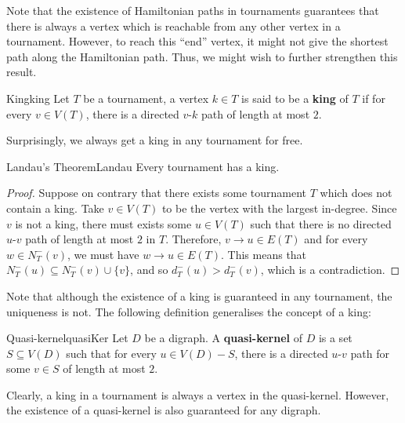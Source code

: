 \documentclass[math]{amznotes}
\theoremstyle{remark}
\newcommand{\0}{\mathbf{0}}
\newcommand{\1}{\mathbf{1}}
\begin{document}
Note that the existence of Hamiltonian paths in tournaments guarantees that there is always a vertex which is reachable from any other vertex in a tournament. However, to reach this ``end'' vertex, it might not give the shortest path along the Hamiltonian path. Thus, we might wish to further strengthen this result.
\begin{dfnbox}{King}{king}
    Let $T$ be a tournament, a vertex $k \in T$ is said to be a {\color{red} \textbf{king}} of $T$ if for every $v \in V(T)$, there is a directed $v$-$k$ path of length at most $2$.
\end{dfnbox}
Surprisingly, we always get a king in any tournament for free.
\begin{thmbox}{Landau's Theorem}{Landau}
    Every tournament has a king.
    \tcblower
    \begin{proof}
        Suppose on contrary that there exists some tournament $T$ which does not contain a king. Take $v \in V(T)$ to be the vertex with the largest in-degree. Since $v$ is not a king, there must exists some $u \in V(T)$ such that there is no directed $u$-$v$ path of length at most $2$ in $T$. Therefore, $v \to u \in E(T)$ and for every $w \in N_T^-(v)$, we must have $w \to u \in E(T)$. This means that $N_T^-(u) \subseteq N_T^-(v) \cup \{v \}$, and so $d_T^-(u) > d_T^-(v)$, which is a contradiction.
    \end{proof}
\end{thmbox}
Note that although the existence of a king is guaranteed in any tournament, the uniqueness is not. The following definition generalises the concept of a king:
\begin{dfnbox}{Quasi-kernel}{quasiKer}
    Let $D$ be a digraph. A {\color{red} \textbf{quasi-kernel}} of $D$ is a set $S \subseteq V(D)$ such that for every $u \in V(D) - S$, there is a directed $u$-$v$ path for some $v \in S$ of length at most $2$.
\end{dfnbox}
Clearly, a king in a tournament is always a vertex in the quasi-kernel. However, the existence of a quasi-kernel is also guaranteed for any digraph.
\end{document}
